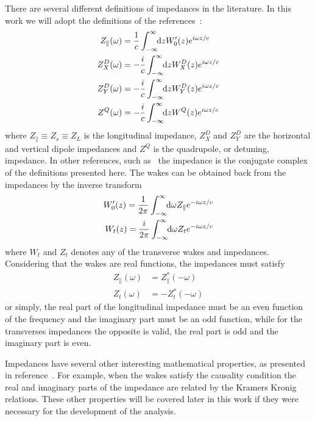     There are several different definitions of impedances in the literature. In this work we will adopt the definitions of the references~\cite{CHao1993, Stupakov2000a, Heifets1991}:
    \begin{align}\label{eq:impedances_definition}
	  	\nonumber
  	  	Z_\parallel(\omega) &= \frac1c \infint{z}{W'_0(z)e^{i\omega z/c}}\\
  	  	\nonumber
      	Z^D_X(\omega) &= -\frac{i}{c} \infint{z}{W^D_X(z)e^{i\omega z/c}}\\
      	Z^D_Y(\omega) &= -\frac{i}{c} \infint{z}{W^D_Y(z)e^{i\omega z/c}}\\
	  	\nonumber
      	Z^Q(\omega) &= -\frac{i}{c} \infint{z}{W^Q(z)e^{i\omega z/c}}
    \end{align}
    where $Z_\parallel \equiv Z_s \equiv Z_L$ is the longitudinal impedance, $Z^D_X$ and $Z^D_Y$ are the horizontal and vertical dipole impedances and $Z^Q$ is the quadrupole, or detuning, impedance. In other references, such as~\cite{Zotter1993, Wilson1987} the impedance is the conjugate complex of the definitions presented here. The wakes can be obtained back from the impedances by the inverse transform
    \begin{align}\label{eq:wake_as_impedance}
	  	\nonumber
  	  	W'_0(z) = \frac{1}{2\pi}\int_{-\infty}^{\infty}\!\!\text{d}\omega Z_\parallel e^{-i\omega z/c}\\
	  	W_t(z) = \frac{i}{2\pi}\int_{-\infty}^{\infty}\!\!\text{d}\omega Z_t e^{-i\omega z/c}
    \end{align}
    where $W_t$ and $Z_t$ denotes any of the transverse wakes and impedances. Considering that the wakes are real functions, the impedances must satisfy
    \begin{align}
  	  	Z_\parallel(\omega) &= Z_\parallel^*(-\omega)\\
	  	Z_t(\omega) &= -Z_t^*(-\omega)
    \end{align}
    or simply, the real part of the longitudinal impedance must be an even function of the frequency and the imaginary part must be an odd function, while for the transverses impedances the opposite is valid, the real part is odd and the imaginary part is even.

    Impedances have several other interesting mathematical properties, as presented in reference~\cite{CHao1993}. For example, when the wakes satisfy the causality condition the real and imaginary parts of the impedance are related by the Kramers Kronig relations\cite{kramers}. These other properties will be covered later in this work if they were necessary for the development of the analysis.

